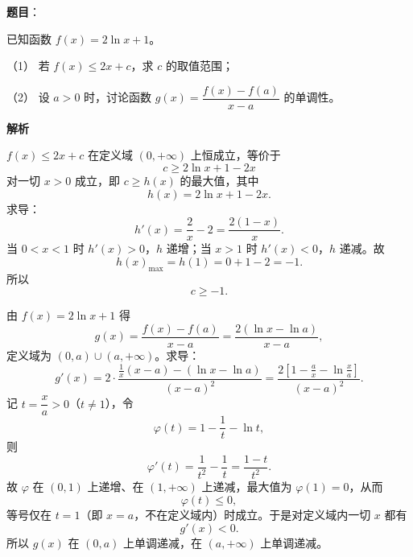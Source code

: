 \begin{answer}

\textbf{题目}：

已知函数 $f(x)=2\ln x+1$。

（1） 若 $f(x)\leqslant2x+c$，求 $c$ 的取值范围；

（2） 设 $a>0$ 时，讨论函数 $g(x)=\dfrac{f(x)-f(a)}{x-a}$ 的单调性。

\textbf{解析}


$f(x)\leqslant2x+c$ 在定义域 $(0,+\infty)$ 上恒成立，等价于
\nopagebreak[4]
\[c\geqslant 2\ln x+1-2x\]
对一切 $x>0$ 成立，即 $c\geqslant h(x)$ 的最大值，其中
\nopagebreak[4]
\[h(x)=2\ln x+1-2x .\]
求导：
\nopagebreak[4]
\[h'(x)=\frac2x-2=\frac{2(1-x)}x .\]
当 $0<x<1$ 时 $h'(x)>0$，$h$ 递增；当 $x>1$ 时 $h'(x)<0$，$h$ 递减。故
\nopagebreak[4]
\[h(x)_{\max}=h(1)=0+1-2=-1 .\]
所以
\nopagebreak[4]
\[c\geqslant-1 .\]


由 $f(x)=2\ln x+1$ 得
\nopagebreak[4]
\[g(x)=\frac{f(x)-f(a)}{x-a}=\frac{2\left(\ln x-\ln a\right)}{x-a},\]
定义域为 $(0,a)\cup(a,+\infty)$。求导：
\nopagebreak[4]
\[g'(x)=2\cdot\frac{\frac1x(x-a)-\left(\ln x-\ln a\right)}{(x-a)^2}
=\frac{2\left[1-\frac ax-\ln\frac xa\right]}{(x-a)^2} .\]
记 $t=\dfrac xa>0$（$t\neq1$），令
\nopagebreak[4]
\[\varphi(t)=1-\frac1t-\ln t,\]
则
\nopagebreak[4]
\[\varphi'(t)=\frac1{t^2}-\frac1t=\frac{1-t}{t^2} .\]
故 $\varphi$ 在 $(0,1)$ 上递增、在 $(1,+\infty)$ 上递减，最大值为 $\varphi(1)=0$，从而
\nopagebreak[4]
\[\varphi(t)\leqslant0,\]
等号仅在 $t=1$（即 $x=a$，不在定义域内）时成立。于是对定义域内一切 $x$ 都有
\nopagebreak[4]
\[g'(x)<0 .\]
所以 $g(x)$ 在 $(0,a)$ 上单调递减，在 $(a,+\infty)$ 上单调递减。



\end{answer}
